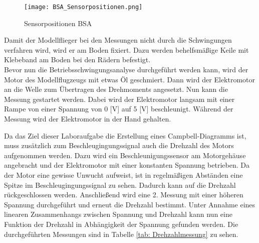     \begin{figure}[H]
        \centering
        \texttt{[image: BSA\_Sensorpositionen.png]}
        \caption{Sensorpositionen BSA}
        \label{fig: Sensorpos_BSA}
    \end{figure}

    \noindent
    Damit der Modellflieger bei den Messungen nicht durch die Schwingungen
    verfahren wird, wird er am Boden fixiert. Dazu werden behelfsmäßige Keile mit
    Klebeband am Boden bei den Rädern befestigt.
    \\

    \noindent
    Bevor nun die Betriebsschwingungsanalyse durchgeführt werden kann, wird der
    Motor des Modellflugzeugs mit etwas Öl geschmiert. Dann wird der Elektromotor
    an die Welle zum Übertragen des Drehmoments angesetzt. Nun kann die Messung
    gestartet werden. Dabei wird der Elektromotor langsam mit einer Rampe von einer
    Spannung von 0 [V] auf 5 [V] beschleunigt. Während der Messung wird der
    Elektromotor in der Hand gehalten.

    \noindent
    Da das Ziel dieser Laboraufgabe die Erstellung eines Campbell-Diagramms ist,
    muss zusätzlich zum Beschleugingungssignal auch die Drehzahl des Motors
    aufgenommen werden. Dazu wird ein Beschleunigungssensor am Motorgehäuse
    angebracht und der Elektromotor mit einer konstanten Spannung betrieben. Da
    der Motor eine gewisse Unwucht aufweist, ist in regelmäßigen Abständen eine
    Spitze im Beschleugingungssignal zu sehen. Dadurch kann auf die Drehzahl
    rückgeschlossen werden. Anschließend wird eine 2. Messung mit einer höheren
    Spannung durchgeführt und erneut die Drehzahl bestimmt. Unter Annahme eines
    linearen Zusammenhangs zwischen Spannung und Drehzahl kann nun eine Funktion
    der Drehzahl in Abhängigkeit der Spannung gefunden werden. Die durchgeführten
    Messungen sind in Tabelle \ref{tab: Drehzahlmessung} zu sehen.

